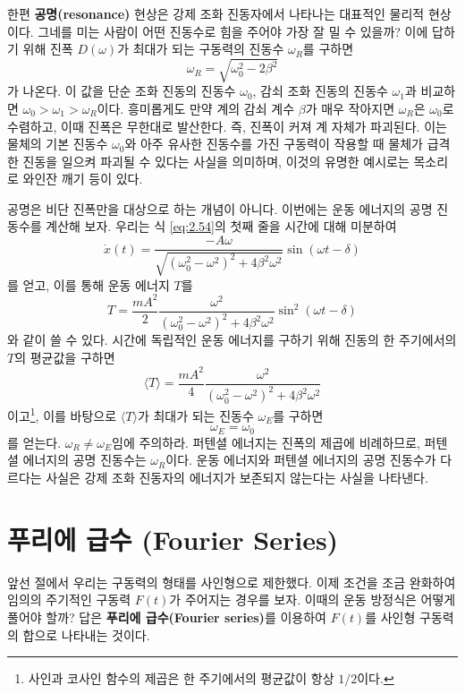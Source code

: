\documentclass[chapter, oneside, b5paper]{oblivoir}
\theoremstyle{plain}
\theoremstyle{definition}
\theoremstyle{remark}
\begin{document}
한편 \textbf{공명(resonance)} 현상은 강제 조화 진동자에서 나타나는 대표적인 물리적 현상이다. 그네를 미는 사람이 어떤 진동수로 힘을 주어야 가장 잘 밀 수 있을까? 이에 답하기 위해 진폭 $D(\omega)$가 최대가 되는 구동력의 진동수 $\omega_R$를 구하면
\begin{equation}
    \omega_R = \sqrt{\omega_0^2-2\beta^2} \label{eq:2.55}
\end{equation}
가 나온다. 이 값을 단순 조화 진동의 진동수 $\omega_0$, 감쇠 조화 진동의 진동수 $\omega_1$과 비교하면 $\omega_0>\omega_1>\omega_R$이다. 흥미롭게도 만약 계의 감쇠 계수 $\beta$가 매우 작아지면 $\omega_R$은 $\omega_0$로 수렴하고, 이때 진폭은 무한대로 발산한다. 즉, 진폭이 커져 계 자체가 파괴된다. 이는 물체의 기본 진동수 $\omega_0$와 아주 유사한 진동수를 가진 구동력이 작용할 때 물체가 급격한 진동을 일으켜 파괴될 수 있다는 사실을 의미하며, 이것의 유명한 예시로는 목소리로 와인잔 깨기 등이 있다.

공명은 비단 진폭만을 대상으로 하는 개념이 아니다. 이번에는 운동 에너지의 공명 진동수를 계산해 보자. 우리는 식 \ref{eq:2.54}의 첫째 줄을 시간에 대해 미분하여
\begin{equation}
    \dot{x}(t) = \frac{-A\omega}{\sqrt{(\omega_0^2-\omega^2)^2+4\beta^2 \omega^2}} \sin{(\omega t-\delta)} \label{eq:2.56}
\end{equation}
를 얻고, 이를 통해 운동 에너지 $T$를
\begin{equation}
    T= \frac{mA^2}{2}\frac{\omega^2}{(\omega_0^2-\omega^2)^2+4\beta^2 \omega^2} \sin^2{(\omega t-\delta)} \label{eq:2.57}
\end{equation}
와 같이 쓸 수 있다. 시간에 독립적인 운동 에너지를 구하기 위해 진동의 한 주기에서의 $T$의 평균값을 구하면
\begin{equation}
    \langle T \rangle = \frac{mA^2}{4}\frac{\omega^2}{(\omega_0^2-\omega^2)^2+4\beta^2 \omega^2} \label{eq:2.58}
\end{equation}
이고\footnote{사인과 코사인 함수의 제곱은 한 주기에서의 평균값이 항상 $1/2$이다.}, 이를 바탕으로 $\langle T \rangle$가 최대가 되는 진동수 $\omega_E$를 구하면
\begin{equation}
    \omega_E=\omega_0 \label{eq:2.59}
\end{equation}
를 얻는다. $\omega_R \neq \omega_E$임에 주의하라. 퍼텐셜 에너지는 진폭의 제곱에 비례하므로, 퍼텐셜 에너지의 공명 진동수는 $\omega_R$이다. 운동 에너지와 퍼텐셜 에너지의 공명 진동수가 다르다는 사실은 강제 조화 진동자의 에너지가 보존되지 않는다는 사실을 나타낸다.

\section{푸리에 급수 (Fourier Series)}
앞선 절에서 우리는 구동력의 형태를 사인형으로 제한했다. 이제 조건을 조금 완화하여 임의의 주기적인 구동력 $F(t)$가 주어지는 경우를 보자. 이때의 운동 방정식은 어떻게 풀어야 할까? 답은 \textbf{푸리에 급수(Fourier series)}를 이용하여 $F(t)$를 사인형 구동력의 합으로 나타내는 것이다.
\end{document}
